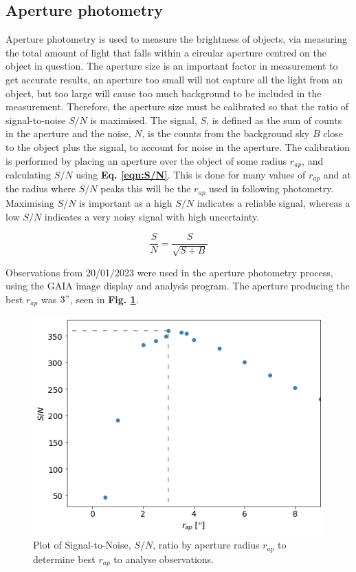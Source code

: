 \documentclass[10pt,twocolumn]{revtex4}    %
\begin{document}
\subsection{Aperture photometry}\label{ssec:aperturePhotometry}
Aperture photometry is used to measure the brightness of objects, via measuring the total amount of light that falls within a circular aperture centred on the object in question. 
The aperture size is an important factor in measurement to get accurate results, an aperture too small will not capture all the light from an object, but too large will cause too much background to be included in the measurement. Therefore, the aperture size must be calibrated so that the ratio of signal-to-noise $S/N$ is maximised. The signal, $S$, is defined as the sum of counts in the aperture and the noise, $N$, is the counts from the background sky $B$ close to the object plus the signal, to account for noise in the aperture. The calibration is performed by placing an aperture over the object of some radius $r_{ap}$, and calculating $S/N$ using \textbf{Eq. \ref{eqn:S/N}}. This is done for many values of $r_{ap}$ and at the radius where $S/N$ peaks this will be the $r_{ap}$ used in following photometry. Maximising $S/N$ is important as a high $S/N$ indicates a reliable signal, whereas a low $S/N$ indicates a very noisy signal with high uncertainty. 

\begin{equation}\label{eqn:S/N}
    \frac{S}{N} = \frac{S}{\sqrt{S + B}}
\end{equation}


Observations from 20/01/2023 were used in the aperture photometry process, using the GAIA image display and analysis program. The aperture producing the best $r_{ap}$ was $3"$, seen in \textbf{Fig. \ref{fig:SMAPlot}}.

\begin{figure}
    \centering
    \includegraphics[width=\linewidth]{ApPhotoPlot.png}
    \caption{Plot of Signal-to-Noise, $S/N$, ratio by aperture radius $r_{ap}$ to determine best $r_{ap}$ to analyse observations. }
    \label{fig:SMAPlot}
\end{figure}
\end{document}
